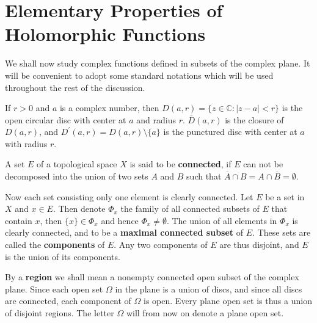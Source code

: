 \section{Elementary Properties of Holomorphic Functions}
We shall now study complex functions defined in subsets of the complex plane. It will be convenient to adopt some standard notations which will be used throughout the rest of the discussion.\par
If $r>0$ and $a$ is a complex number, then $D(a,r)=\{z\in\mathbb{C}:|z-a|<r\}$ is the open circular disc with center at $a$ and radius $r$. $\overline{D}(a,r)$ is the closure of $D(a,r)$, and $D^\prime(a,r)=D(a,r)\setminus\{a\}$ is the punctured disc with center at $a$ with radius $r$.\par
A set $E$ of a topological space $X$ is said to be \textbf{connected}, if $E$ can not be decomposed into the union of two sets $A$ and $B$ such that $\overline{A}\cap B=A\cap\overline{B}=\emptyset$.\par
Now each set consisting only one element is clearly connected. Let $E$ be a set in $X$ and $x\in E$. Then denote $\Phi_x$ the family of all connected subsets of $E$ that contain $x$, then $\{x\}\in\Phi_x$ and hence $\Phi_x\ne\emptyset$. The union of all elements in $\Phi_x$ is clearly connected, and to be a \textbf{maximal connected subset} of $E$. These sets are called the \textbf{components} of $E$. Any two components of $E$ are thus disjoint, and $E$ is the union of its components.\par
By a \textbf{region} we shall mean a nonempty connected open subset of the complex plane. Since each open set $\Omega$ in the plane is a union of discs, and since all discs are connected, each component of $\Omega$ is open. Every plane open set is thus a union of disjoint regions. The letter $\Omega$ will from now on denote a plane open set.
